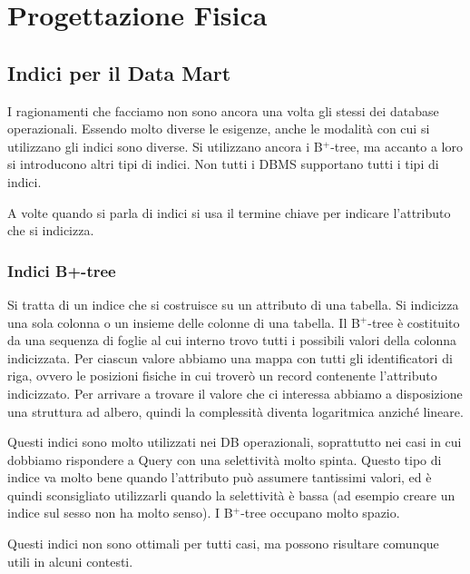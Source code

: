 \section{Progettazione Fisica}

\subsection{Indici per il Data Mart}

I ragionamenti che facciamo non sono ancora una volta gli stessi dei database operazionali. Essendo molto diverse le esigenze, anche le modalità con cui si utilizzano gli indici sono diverse. Si utilizzano ancora i B$^{+}$-tree, ma accanto a loro si introducono altri tipi di indici. Non tutti i DBMS supportano tutti i tipi di indici.

\begin{warn}
	A volte quando si parla di indici si usa il termine chiave per indicare l'attributo che si indicizza.
\end{warn}

\subsubsection{Indici B+-tree}
Si tratta di un indice che si costruisce su un attributo di una tabella. Si indicizza una sola colonna o un insieme delle colonne di una tabella. Il B$^{+}$-tree è costituito da una sequenza di foglie al cui interno trovo tutti i possibili valori della colonna indicizzata. Per ciascun valore abbiamo una mappa con tutti gli identificatori di riga, ovvero le posizioni fisiche in cui troverò un record contenente l'attributo indicizzato. Per arrivare a trovare il valore che ci interessa abbiamo a disposizione una struttura ad albero, quindi la complessità diventa logaritmica anziché lineare.

\noindent Questi indici sono molto utilizzati nei DB operazionali, soprattutto nei casi in cui dobbiamo rispondere a Query con una selettività molto spinta. Questo tipo di indice va molto bene quando l'attributo può assumere tantissimi valori, ed è quindi sconsigliato utilizzarli quando la selettività è bassa (ad esempio creare un indice sul sesso non ha molto senso). I B$^{+}$-tree occupano molto spazio.

\noindent Questi indici non sono ottimali per tutti casi, ma possono risultare comunque utili in alcuni contesti.

